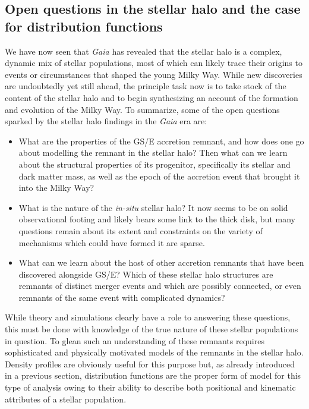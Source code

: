 \subsection{Open questions in the stellar halo and the case for distribution functions}

We have now seen that \textit{Gaia} has revealed that the stellar halo is a complex, dynamic mix of stellar populations, most of which can likely trace their origins to events or circumstances that shaped the young Milky Way. While new discoveries are undoubtedly yet still ahead, the principle task now is to take stock of the content of the stellar halo and to begin synthesizing an account of the formation and evolution of the Milky Way. To summarize, some of the open questions sparked by the stellar halo findings in the \textit{Gaia} era are:

\begin{itemize}
    \item What are the properties of the GS/E accretion remnant, and how does one go about modelling the remnant in the stellar halo? Then what can we learn about the structural properties of its progenitor, specifically its stellar and dark matter mass, as well as the epoch of the accretion event that brought it into the Milky Way?
    
    \item What is the nature of the \textit{in-situ} stellar halo? It now seems to be on solid observational footing and likely bears some link to the thick disk, but many questions remain about its extent and constraints on the variety of mechanisms which could have formed it are sparse.
    
    \item What can we learn about the host of other accretion remnants that have been discovered alongside GS/E? Which of these stellar halo structures are remnants of distinct merger events and which are possibly connected, or even remnants of the same event with complicated dynamics?
\end{itemize}

While theory and simulations clearly have a role to answering these questions, this must be done with knowledge of the true nature of these stellar populations in question. To glean such an understanding of these remnants requires sophisticated and physically motivated models of the remnants in the stellar halo. Density profiles are obviously useful for this purpose but, as already introduced in a previous section, distribution functions are the proper form of model for this type of analysis owing to their ability to describe both positional and kinematic attributes of a stellar population.

